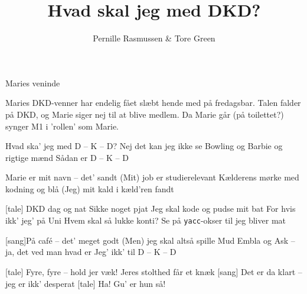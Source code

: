 \documentclass[10pt]{article}
\title{Hvad skal jeg med DKD?}
\author{Pernille Rasmussen \& Tore Green}
\begin{document}
\maketitle

\begin{roles}
   Maries veninde
\end{roles}

\scene
Maries DKD-venner har endelig fået slæbt hende med på
fredagsbar. Talen falder på DKD, og Marie siger nej til at blive
medlem.
Da Marie går (på toilettet?) synger M1 i 'rollen' som Marie.


\begin{song}
     Hvad ska' jeg med D -- K -- D?
               Nej det kan jeg ikke se
               Bowling og Barbie og rigtige mænd
               Sådan er D -- K -- D

     Marie er mit navn -- det' sandt
               (Mit) job er studierelevant
               Kælderens mørke med kodning og blå
               (Jeg) mit kald i kæld'ren fandt
               
\sings{}[tale] DKD dag og nat
               Sikke noget pjat
               Jeg skal kode og pudse mit bat
               For hvis ikk' jeg' på Uni
               Hvem skal så lukke konti?
               Se på {\tt yacc}-okser til jeg bliver mat

[sang]På caf\' e -- det' meget godt
               (Men) jeg skal altså spille Mud
               Embla og Ask -- ja, det ved man hvad er
               Jeg' ikk' til D -- K -- D

\sings{}[tale]    Fyre, fyre -- hold jer væk!
                         Jeres stolthed får et knæk
\sings{}[sang]   Det er da klart -- jeg er ikk' desperat
\sings{}[tale]    Ha! Gu' er hun så!

\end{song}
\end{document}
